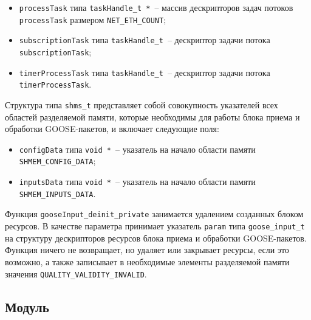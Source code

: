 \begin{itemize}
    \item \lstinline{processTask} типа \lstinline{taskHandle_t *}~-- массив дескрипторов задач потоков \lstinline{processTask} размером \lstinline{NET_ETH_COUNT};
    \item \lstinline{subscriptionTask} типа \lstinline{taskHandle_t}~-- дескриптор задачи потока \lstinline{subscriptionTask};
    \item \lstinline{timerProcessTask} типа \lstinline{taskHandle_t}~-- дескриптор задачи потока \lstinline{timerProcessTask}.
\end{itemize}

Структура типа \lstinline{shms_t} представляет собой совокупность указателей всех областей разделяемой памяти, которые необходимы для работы блока приема и обработки GOOSE-пакетов, и включает следующие поля:

\begin{itemize}
    \item \lstinline{configData} типа \lstinline{void *}~-- указатель на начало области памяти \lstinline{SHMEM_CONFIG_DATA};
    \item \lstinline{inputsData} типа \lstinline{void *}~-- указатель на начало области памяти \lstinline{SHMEM_INPUTS_DATA}.
\end{itemize}

Функция \lstinline{gooseInput_deinit_private} занимается удалением созданных блоком ресурсов. В качестве параметра принимает указатель \lstinline{param} типа
\lstinline{goose_input_t} на структуру дескрипторов ресурсов блока приема и обработки GOOSE-пакетов. Функция ничего не возвращает, но удаляет или закрывает ресурсы,
если это возможно, а также записывает в необходимые элементы разделяемой памяти
значения \lstinline{QUALITY_VALIDITY_INVALID}.

\subsection{Модуль \moduleRecvPackets}

